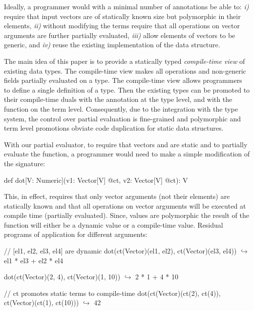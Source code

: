 Ideally, a programmer would with a minimal number of annotations be able to:
 \emph{i)} require that input vectors are of statically known size but polymorphic
  in their elements, \emph{ii)} without modifying the terms require that all operations
  on vector arguments are further partially evaluated, \emph{iii)} allow elements
  of vectors to be generic, and \emph{iv)} reuse the existing implementation of
  the  data structure.

The main idea of this paper is to provide a statically typed \emph{compile-time
 view} of existing data types. The compile-time view makes all operations and
 non-generic fields partially evaluated on a type. The compile-time view allows
 programmers to define a single definition of a type. Then the existing types
 can be promoted to their compile-time duals with the  annotation at
 the type level, and with the  function on the term level.
 Consequently, due to the integration with the type system, the control over
 partial evaluation is fine-grained and polymorphic and term level promotions
 obviate code duplication for static data structures.

With our partial evaluator, to require that vectors  and  are
 static and to partially evaluate the function, a programmer would need to make
 a simple modification of the  signature:\begin{lstparagraph}
  def dot[V: Numeric](v1: Vector[V] @ct, v2: Vector[V] @ct): V
\end{lstparagraph}

This, in effect, requires that only vector arguments (not their elements) are
 statically known and that all operations on vector arguments will be executed
 at compile time (partially evaluated). Since, values are polymorphic the result
 of the function will either be a dynamic value or a compile-time value. Residual
 programs of  application for different arguments:

\vspace{1.8mm}
\begin{listing}[mathescape]
  // [el1, el2, el3, el4] are dynamic
  dot(ct(Vector)(el1, el2), ct(Vector)(el3, el4))
    $\hookrightarrow$ el1 * el3 + el2 * el4

  dot(ct(Vector)(2, 4), ct(Vector)(1, 10))
    $\hookrightarrow$ 2 * 1 + 4 * 10

  // ct promotes static terms to compile-time
  dot(ct(Vector)(ct(2), ct(4)), ct(Vector)(ct(1), ct(10)))
    $\hookrightarrow$ 42
\end{listing}
\vspace{1.8mm}

